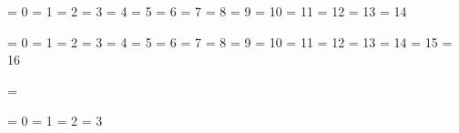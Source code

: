 
\newif\ifdone



\chardef\@@escape      =  0
\chardef\@@begingroup  =  1
\chardef\@@endgroup    =  2
\chardef\@@mathshift   =  3
\chardef\@@alignment   =  4
\chardef\@@endofline   =  5
\chardef\@@parameter   =  6
\chardef\@@superscript =  7
\chardef\@@subscript   =  8
\chardef\@@ignore      =  9
\chardef\@@space       = 10
\chardef\@@letter      = 11
\chardef\@@other       = 12
\chardef\@@active      = 13
\chardef\@@comment     = 14


\chardef\@@bottomlevelgroup   =  0
\chardef\@@simplegroup        =  1
\chardef\@@hboxgroup          =  2
\chardef\@@adjustedhboxgroup  =  3
\chardef\@@vboxgroup          =  4
\chardef\@@vtopgroup          =  5
\chardef\@@aligngroup         =  6
\chardef\@@noaligngroup       =  7
\chardef\@@outputgroup        =  8
\chardef\@@mathgroup          =  9
\chardef\@@discretionarygroup = 10
\chardef\@@insertgroup        = 11
\chardef\@@vcentergroup       = 12
\chardef\@@mathchoicegroup    = 13
\chardef\@@semisimplegroup    = 14
\chardef\@@mathshiftgroup     = 15
\chardef\@@mathleftgroup      = 16

\chardef\@@vadjustgroup       = \@@insertgroup


\chardef\@@batchmode     = 0
\chardef\@@nonstopmode   = 1
\chardef\@@scrollmode    = 2
\chardef\@@errorstopmode = 3



